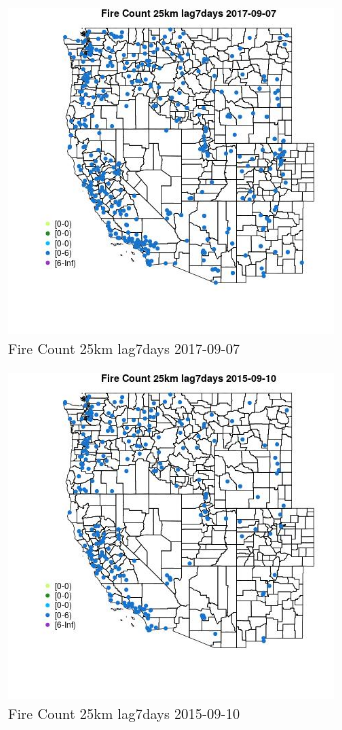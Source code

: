 \begin{figure} 
\centering  
\includegraphics[width=0.77\textwidth]{Code_Outputs/Report_ML_input_PM25_Step4_part_e_de_duplicated_aves_compiled_2019-05-20wNAs_MapObsFire_Count_25km_lag7days2017-09-07.jpg} 
\caption{\label{fig:Report_ML_input_PM25_Step4_part_e_de_duplicated_aves_compiled_2019-05-20wNAsMapObsFire_Count_25km_lag7days2017-09-07}Fire Count 25km lag7days 2017-09-07} 
\end{figure} 
 

\begin{figure} 
\centering  
\includegraphics[width=0.77\textwidth]{Code_Outputs/Report_ML_input_PM25_Step4_part_e_de_duplicated_aves_compiled_2019-05-20wNAs_MapObsFire_Count_25km_lag7days2015-09-10.jpg} 
\caption{\label{fig:Report_ML_input_PM25_Step4_part_e_de_duplicated_aves_compiled_2019-05-20wNAsMapObsFire_Count_25km_lag7days2015-09-10}Fire Count 25km lag7days 2015-09-10} 
\end{figure} 
 

